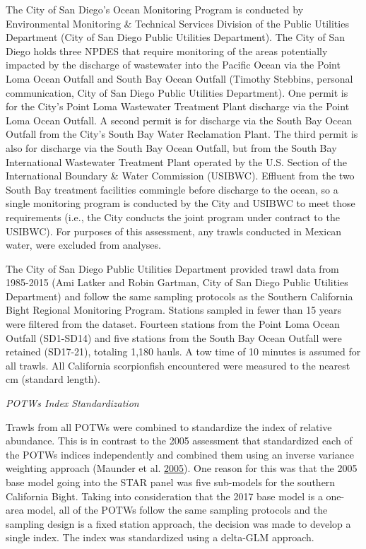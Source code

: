 \documentclass[12pt,]{article}
\begin{document}
The City of San Diego's Ocean Monitoring Program is conducted by
Environmental Monitoring \& Technical Services Division of the Public
Utilities Department (City of San Diego Public Utilities Department).
The City of San Diego holds three NPDES that require monitoring of the
areas potentially impacted by the discharge of wastewater into the
Pacific Ocean via the Point Loma Ocean Outfall and South Bay Ocean
Outfall (Timothy Stebbins, personal communication, City of San Diego
Public Utilities Department). One permit is for the City's Point Loma
Wastewater Treatment Plant discharge via the Point Loma Ocean Outfall. A
second permit is for discharge via the South Bay Ocean Outfall from the
City's South Bay Water Reclamation Plant. The third permit is also for
discharge via the South Bay Ocean Outfall, but from the South Bay
International Wastewater Treatment Plant operated by the U.S. Section of
the International Boundary \& Water Commission (USIBWC). Effluent from
the two South Bay treatment facilities commingle before discharge to the
ocean, so a single monitoring program is conducted by the City and
USIBWC to meet those requirements (i.e., the City conducts the joint
program under contract to the USIBWC). For purposes of this assessment,
any trawls conducted in Mexican water, were excluded from analyses.

The City of San Diego Public Utilities Department provided trawl data
from 1985-2015 (Ami Latker and Robin Gartman, City of San Diego Public
Utilities Department) and follow the same sampling protocols as the
Southern California Bight Regional Monitoring Program. Stations sampled
in fewer than 15 years were filtered from the dataset. Fourteen stations
from the Point Loma Ocean Outfall (SD1-SD14) and five stations from the
South Bay Ocean Outfall were retained (SD17-21), totaling 1,180 hauls. A
tow time of 10 minutes is assumed for all trawls. All California
scorpionfish encountered were measured to the nearest cm (standard
length).

\emph{POTWs Index Standardization}

Trawls from all POTWs were combined to standardize the index of relative
abundance. This is in contrast to the 2005 assessment that standardized
each of the POTWs indices independently and combined them using an
inverse variance weighting approach (Maunder et al.
\protect\hyperlink{ref-Maunder2005}{2005}). One reason for this was that
the 2005 base model going into the STAR panel was five sub-models for
the southern California Bight. Taking into consideration that the 2017
base model is a one-area model, all of the POTWs follow the same
sampling protocols and the sampling design is a fixed station approach,
the decision was made to develop a single index. The index was
standardized using a delta-GLM approach.
\end{document}
